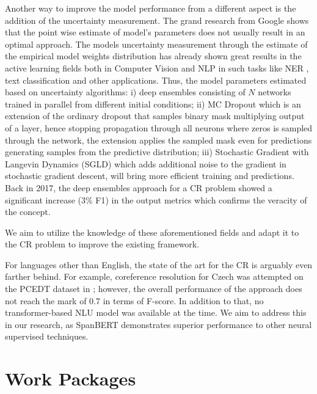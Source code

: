 Another way to improve the model performance from a different aspect is the addition of the uncertainty measurement. 
The grand research from Google \cite{ovadia2019can} shows that the point wise estimate of model’s parameters does not usually result in an optimal approach. The models uncertainty measurement through the estimate of the empirical model weights distribution has already shown great results in the active learning fields both in Computer Vision \cite{gal2017deep} and NLP in such tasks like NER \cite{shen2017deep, lowell2018practical}, text classification \cite{an2018deep} and other applications. 
Thus, the model parameters estimated based on uncertainty algorithms: i) deep ensembles \cite{lakshminarayanan2016simple} consisting of $N$ networks trained in parallel from different initial conditions; ii) MC Dropout \cite{gal2017deep} which is an extension of the ordinary dropout that samples binary mask multiplying output of a layer, hence stopping propagation through all neurons where zeros is sampled through the network, the extension applies the sampled mask even for predictions generating samples from the predictive distribution; iii) Stochastic Gradient with Langevin Dynamics (SGLD) \cite{welling2011bayesian} which adds additional noise to the gradient in stochastic gradient descent, will bring more efficient training and predictions. 
Back in 2017, the deep ensembles approach for a CR problem \cite{cr-Lee17} showed a significant increase (3\% F1) in the output metrics which confirms the veracity of the concept.

We aim to utilize the knowledge of these aforementioned fields and adapt it to the CR problem to improve the existing framework.

{\color{red}
For languages other than English, the state of the art for the CR is arguably even farther behind. 
For example, coreference resolution for Czech was attempted on the PCEDT dataset \cite{pcedt-Hajic2012} in \cite{cr-cz-Novak17}; however, the overall performance of the approach does not reach the mark of 0.7 in terms of F-score. 
In addition to that, no transformer-based NLU model was available at the time. 
We aim to address this in our research, as SpanBERT demonstrates superior performance to other neural supervised techniques.
}

\section{Work Packages}\label{sec:wp}

